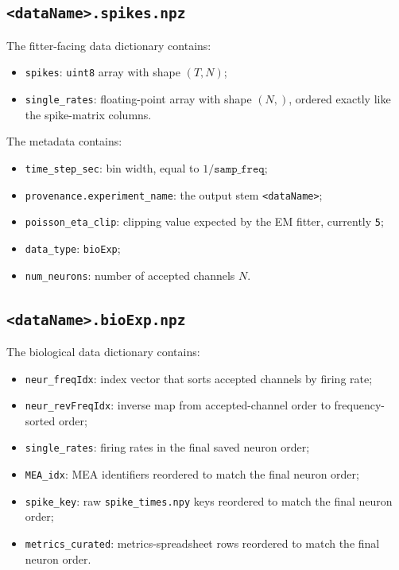 \documentclass[11pt]{article}
\begin{document}
\subsection{\texttt{<dataName>.spikes.npz}}

The fitter-facing data dictionary contains:
\begin{itemize}
  \item \texttt{spikes}: \texttt{uint8} array with shape \((T,N)\);
  \item \texttt{single\_rates}: floating-point array with shape \((N,)\),
        ordered exactly like the spike-matrix columns.
\end{itemize}

The metadata contains:
\begin{itemize}
  \item \texttt{time\_step\_sec}: bin width, equal to
        \(1/\texttt{samp\_freq}\);
  \item \texttt{provenance.experiment\_name}: the output stem
        \texttt{<dataName>};
  \item \texttt{poisson\_eta\_clip}: clipping value expected by the EM
        fitter, currently \texttt{5};
  \item \texttt{data\_type}: \texttt{bioExp};
  \item \texttt{num\_neurons}: number of accepted channels \(N\).
\end{itemize}

\subsection{\texttt{<dataName>.bioExp.npz}}

The biological data dictionary contains:
\begin{itemize}
  \item \texttt{neur\_freqIdx}: index vector that sorts accepted channels
        by firing rate;
  \item \texttt{neur\_revFreqIdx}: inverse map from accepted-channel order
        to frequency-sorted order;
  \item \texttt{single\_rates}: firing rates in the final saved neuron
        order;
  \item \texttt{MEA\_idx}: MEA identifiers reordered to match the final
        neuron order;
  \item \texttt{spike\_key}: raw \texttt{spike\_times.npy} keys reordered
        to match the final neuron order;
  \item \texttt{metrics\_curated}: metrics-spreadsheet rows reordered to
        match the final neuron order.
\end{itemize}
\end{document}
